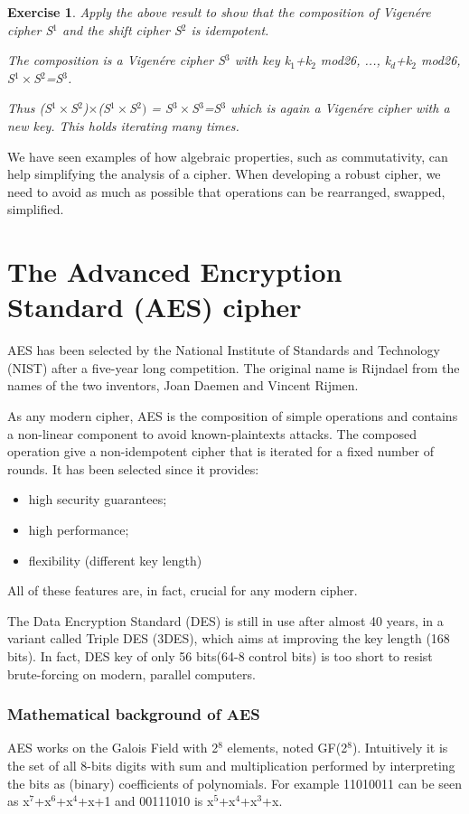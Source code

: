 \documentclass[a4paper, 12pt]{report}
\newtheorem{exercise}{\textbf{Exercise}}
\begin{document}
\begin{exercise}
	Apply the above result to show that the composition of Vigenére cipher S$^1$ and the shift cipher S$^2$ is idempotent.
	
	The composition is a Vigenére cipher S$^3$ with key k$_1$+k$_2$ mod26, ..., k$_d$+k$_2$ mod26, S$^1\times$S$^2$=S$^3$.
	
	Thus (S$^1\times$S$^2$)$\times$(S$^1\times$S$^2)$ = S$^3\times$S$^3$=S$^3$ which is again a Vigenére cipher with a new key. This holds iterating many times. 
\end{exercise}

We have seen examples of how algebraic properties, such as commutativity, can help simplifying the analysis of a cipher. When developing a robust cipher, we need to avoid as much as possible that operations can be rearranged, swapped, simplified.

\section*{The Advanced Encryption Standard (AES) cipher}
AES has been selected by the National Institute of Standards and Technology (NIST) after a five-year long competition. The original name is Rijndael from the names of the two inventors, Joan Daemen and Vincent Rijmen.

As any modern cipher, AES is the composition of simple operations and contains a non-linear component to avoid known-plaintexts attacks. The composed operation give a non-idempotent cipher that is iterated for a fixed number of rounds.
\newpage
It has been selected since it provides:
\begin{itemize}
	\item high security guarantees;
	\item high performance;
	\item flexibility (different key length)
\end{itemize}
All of these features are, in fact, crucial for any modern cipher.

The Data Encryption Standard (DES) is still in use after almost 40 years, in a variant called Triple DES (3DES), which aims at improving the key length (168 bits). In fact, DES key of only 56 bits(64-8 control bits) is too short to resist brute-forcing on modern, parallel computers.

\subsubsection{Mathematical background of AES}
AES works on the Galois Field with 2$^8$ elements, noted GF(2$^8$). Intuitively it is the set of all 8-bits digits with sum and multiplication performed by interpreting the bits as (binary) coefficients of polynomials. For example 11010011 can be seen as x$^7$+x$^6$+x$^4$+x+1 and 00111010 is x$^5$+x$^4$+x$^3$+x.
\end{document}

